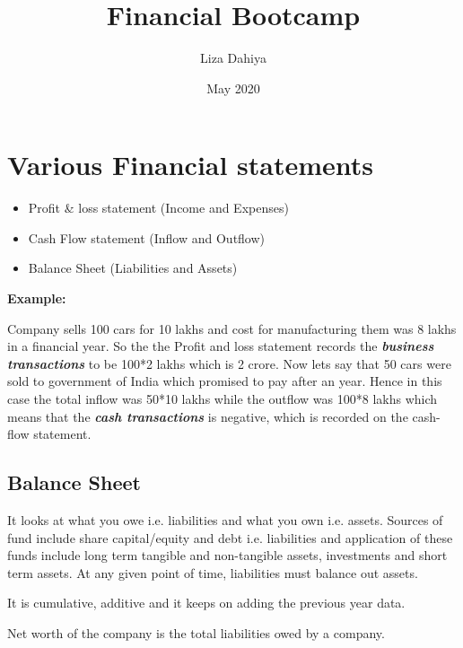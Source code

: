 \documentclass{article}
\title{Financial Bootcamp}
\author{Liza Dahiya}
\date{May 2020}
\begin{document}

\maketitle
\tableofcontents
\section{Various Financial statements}
\begin{itemize}
    \item Profit \& loss statement (Income and Expenses)
    \item Cash Flow statement (Inflow and Outflow)
    \item Balance Sheet (Liabilities and Assets)
\end{itemize}
\textbf{Example:} \par
Company sells 100 cars for 10 lakhs and cost for manufacturing them was 8 lakhs in a financial year. So the the Profit and loss statement records the \textit{\textbf{business transactions}} to be 100*2 lakhs which is 2 crore. Now lets say that 50 cars were sold to government of India which promised to pay after an year. Hence in this case the total inflow was 50*10 lakhs while the outflow was 100*8 lakhs which means that the \textbf{\textit{cash transactions}} is negative, which is recorded on the cash-flow statement. 
\subsection{Balance Sheet}
It looks at what you owe i.e. liabilities and what you own i.e. assets. Sources of fund include share capital/equity and debt i.e. liabilities and application of these funds include long term tangible and non-tangible assets, investments and short term assets. At any given point of time, liabilities must balance out assets.
\par It is cumulative, additive and it keeps on adding the previous year data.
\par Net worth of the company is the total liabilities owed by a company. 
\end{document}
